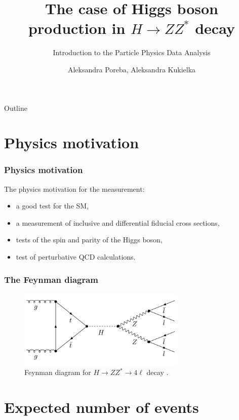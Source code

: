 \documentclass[aspectratio=1610, english]{beamer}
\author[Aleksandra Poreba, Aleksandra Kukielka]{Aleksandra Poreba, Aleksandra Kukielka}
\date{}
\title[The $H \rightarrow ZZ^{*}$ decay analysis]{The case of Higgs boson production in $H \rightarrow ZZ^{*}$ decay}
\subtitle{Introduction to the Particle Physics Data Analysis}
\newcommand{\hzz}{ H\rightarrow ZZ^{*}\rightarrow 4 \ell}
\begin{document}
\maketitle

\begin{frame}{Outline}
	\tableofcontents
\end{frame}

\section{Physics motivation}

\begin{frame}
\frametitle{Physics motivation}
The physics motivation for the measurement:
\begin{itemize}
\item a good test for the SM,
\item a measurement of inclusive and differential fiducial cross sections,
\item tests of the spin and parity of the Higgs boson,
\item test of perturbative QCD calculations.
\end{itemize}

\end{frame}

\begin{frame}
\frametitle{The Feynman diagram}

\begin{figure} [H]
\centering
\includegraphics[width=8cm]{feynman_diagram.png}
\caption{Feynman diagram for $\hzz$ decay \cite{diagram}. }
\end{figure}

\end{frame}

\section{Expected number of events}
\end{document}
